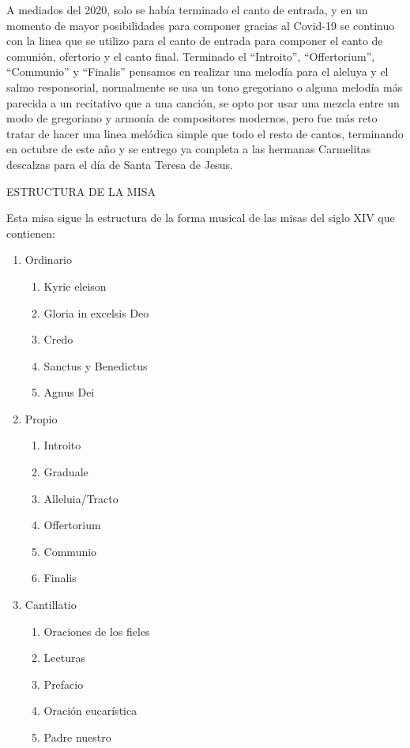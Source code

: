 \documentclass[12pt, letterpaper]{report}
\begin{document}
    A mediados del 2020, solo se hab\'ia terminado el canto de entrada, y en un momento de mayor posibilidades para componer gracias al Covid-19 se continuo con la linea que se utilizo para el canto de entrada para componer el canto de comuni\'on, ofertorio y el canto final.  Terminado el ``Introito'', ``Offertorium'', ``Communio'' y ``Finalis'' pensamos en realizar una melod\'ia para el aleluya y el salmo responsorial, normalmente se usa un tono gregoriano o alguna melod\'ia m\'as parecida a un recitativo que a una canci\'on, se opto por usar una mezcla entre un modo de gregoriano y armon\'ia de compositores modernos, pero fue m\'as reto tratar de hacer una linea mel\'odica simple que todo el resto de cantos, terminando en octubre de este a\~no y se entrego ya completa a las hermanas Carmelitas descalzas para el d\'ia de Santa Teresa de Jesus.

    \LARGE ESTRUCTURA DE LA MISA

    \Large Esta misa sigue la estructura de la forma musical de las misas del siglo XIV que contienen:

    \renewcommand{\theenumi}{\arabic{enumi}}
    \begin{enumerate}
        \item Ordinario
        \begin{enumerate}
            \item Kyrie eleison
            \item Gloria in excelsis Deo
            \item Credo
            \item Sanctus y Benedictus
            \item Agnus Dei
        \end{enumerate}

        \item Propio
        \begin{enumerate}
            \item Introito
            \item Graduale
            \item Alleluia/Tracto
            \item Offertorium
            \item Communio
            \item Finalis
        \end{enumerate}

        \item Cantillatio
        \begin{enumerate}
            \item Oraciones de los fieles
            \item Lecturas
            \item Prefacio
            \item Oraci\'on eucar\'istica
            \item Padre nuestro
        \end{enumerate}
    \end{enumerate}
\end{document}
